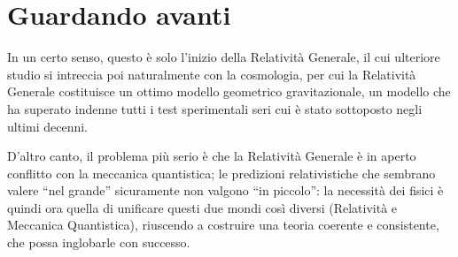 \section{Guardando avanti}

In un certo senso, questo è solo l'inizio della Relatività Generale, il cui ulteriore 
studio si intreccia poi naturalmente con la cosmologia, per cui la
Relatività Generale costituisce un ottimo modello geometrico gravitazionale,
un modello che ha superato indenne tutti i test sperimentali seri cui è stato
sottoposto negli ultimi decenni.

D'altro canto, il problema più serio è che la Relatività Generale è in aperto
conflitto con la meccanica quantistica; le predizioni relativistiche che sembrano 
valere ``nel grande'' sicuramente non valgono ``in piccolo'': la necessità
dei fisici è quindi ora quella di unificare questi due mondi così diversi 
(Relatività e Meccanica Quantistica), riuscendo a costruire una teoria coerente e
consistente, che possa inglobarle con successo.